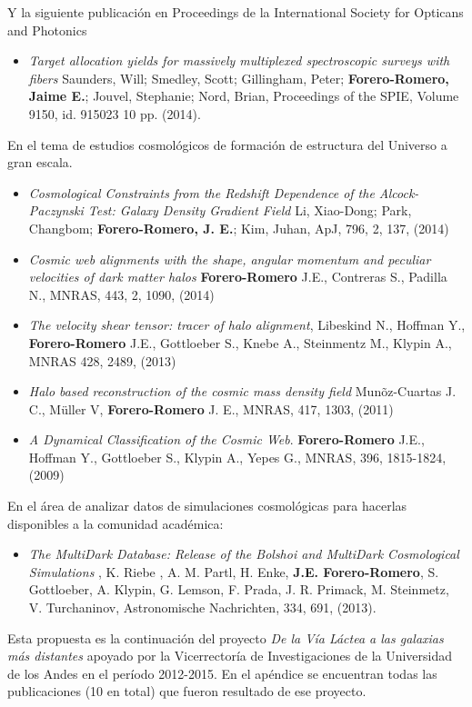 Y la siguiente publicaci\'on en Proceedings de la International
Society for Opticans and Photonics 
\begin{itemize}
\item {\it Target allocation yields for massively multiplexed
  spectroscopic surveys with fibers} 	
	Saunders, Will; Smedley, Scott; Gillingham, Peter;
        {\bf Forero-Romero, Jaime E.}; Jouvel, Stephanie; Nord, Brian,
        Proceedings of the SPIE, Volume 9150, id. 915023 10
        pp. (2014). 
\end{itemize}


En el tema de estudios cosmol\'ogicos de formaci\'on de estructura del
Universo a gran escala.

\begin{itemize}

\item {\it Cosmological Constraints from the Redshift Dependence of
  the Alcock-Paczynski Test: Galaxy Density Gradient Field} 	
	Li, Xiao-Dong; Park, Changbom; {\bf Forero-Romero, J. E.}; Kim,
        Juhan, ApJ, 796, 2, 137, (2014)

\item {\it Cosmic web alignments with the shape, angular momentum and
  peculiar velocities of dark matter halos} {\bf Forero-Romero} J.E.,
  Contreras S., Padilla N., MNRAS, 443, 2, 1090, (2014)

\item{\it The velocity shear tensor: tracer of halo alignment},
  Libeskind N., Hoffman Y., {\bf Forero-Romero} J.E., Gottloeber S.,
  Knebe A., Steinmentz M., Klypin A., MNRAS 428, 2489, (2013) 

\item
{\it Halo based reconstruction of the cosmic mass density field}
Mun\~oz-Cuartas J. C., M\"uller V, {\bf Forero-Romero} J. E., MNRAS,
417, 1303, (2011)

\item
{\it A Dynamical Classification of the  Cosmic Web}.  {\bf
  Forero-Romero} J.E., Hoffman Y.,  Gottloeber S., Klypin A., Yepes G., MNRAS, 396, 1815-1824, (2009)

\end{itemize}


En el \'area de analizar datos de simulaciones cosmol\'ogicas
para hacerlas disponibles a la comunidad acad\'emica:

\begin{itemize}
\item{\it The MultiDark Database: Release of the Bolshoi and
  MultiDark Cosmological Simulations} , K. Riebe , A. M. Partl,
  H. Enke, {\bf J.E. Forero-Romero}, S. Gottloeber, A. Klypin,
  G. Lemson, F. Prada, J. R. Primack, M. Steinmetz, V. Turchaninov,
  Astronomische Nachrichten, 334, 691, (2013). 
\end{itemize}

Esta propuesta es la continuaci\'on del proyecto {\it{De la V\'ia
    L\'actea a las galaxias m\'as distantes}} apoyado por la
Vicerrector\'ia de Investigaciones de la Universidad de los Andes en
el per\'iodo 2012-2015. 
En el ap\'endice se encuentran todas las publicaciones (10 en total)
que fueron resultado de ese proyecto. 




